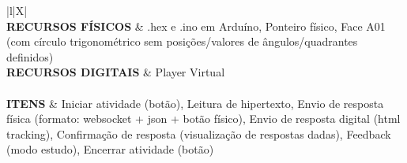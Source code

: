 \begin{xltabular}{\textwidth}{|l|X|}
	 \\ \hline
	\textbf{RECURSOS FÍSICOS} & .hex e .ino em Arduíno, Ponteiro físico, Face A01 (com círculo trigonométrico sem posições/valores de ângulos/quadrantes definidos)  \\ \hline
	\textbf{RECURSOS DIGITAIS} & Player Virtual \\ \hline		
	 \\ \hline
	\textbf{ITENS} & Iniciar atividade (botão), Leitura de hipertexto, Envio de resposta física (formato: websocket + json + botão físico), Envio de resposta digital (html tracking), Confirmação de resposta (visualização de respostas dadas), Feedback (modo estudo), Encerrar atividade (botão)  \\ \hline
	
\end{xltabular}

